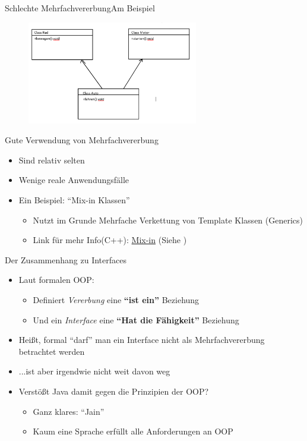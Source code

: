 \begin{frame}{Schlechte Mehrfachvererbung}{Am Beispiel}
    \begin{figure}
        \centering
        \includegraphics[height=4.5cm]{graph/badMI}
    \end{figure}
\end{frame}

\begin{frame}{Gute Verwendung von Mehrfachvererbung}
\begin{itemize}
    \item Sind relativ selten
    \item Wenige reale Anwendungsfälle
    \item Ein Beispiel: "`Mix-in Klassen"'
    \begin{itemize}
        \item Nutzt im Grunde Mehrfache Verkettung von Template Klassen (Generics)
        \item Link für mehr Info(C++): \href{http://www.thinkbottomup.com.au/site/blog/C\%20\%20_Mixins_-_Reuse_through_inheritance_is_good}{Mix-in} (Siehe \cite{mixin})
    \end{itemize}
\end{itemize}
\end{frame}

\begin{frame}{Der Zusammenhang zu Interfaces}
    \begin{itemize}[<+->]
        \item Laut formalen OOP:
        \begin{itemize}
            \item Definiert \textit{Vererbung} eine \textbf{"`ist ein"'} Beziehung
            \item Und ein \textit{Interface} eine \textbf{"`Hat die Fähigkeit"'} Beziehung
        \end{itemize}
        \item Heißt, formal "`darf"' man ein Interface nicht als Mehrfachvererbung betrachtet werden
        \item ...ist aber irgendwie nicht weit davon weg
        \item Verstößt Java damit gegen die Prinzipien der OOP?
        \begin{itemize}[<handout:0>]
            \item Ganz klares: "`Jain"'
            \item Kaum eine Sprache erfüllt alle Anforderungen an OOP
        \end{itemize}
    \end{itemize}
\end{frame}

